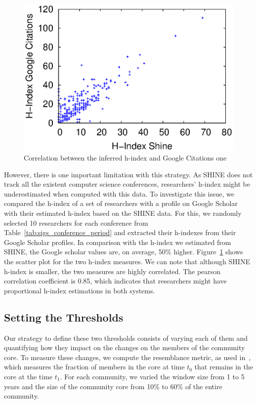 \begin{figure}[!htb]
\centering
\includegraphics[scale=.5]{graficos/hindex/hindex_scatter_plot.eps}
\caption{Correlation between the inferred h-index and Google Citations one}
\label{fig:hindex_scatter_plot}
\end{figure}


However, there is one important limitation with this strategy.  As SHINE does not track all the existent computer science conferences, researchers' h-index might be underestimated when computed
with this data. To investigate this issue, we compared the h-index of a set of researchers with a profile on Google Scholar with their estimated h-index based on the SHINE data. For this, we
randomly selected 10 researchers for each conference from Table~\ref{tab:sigs_conference_period} and extracted their h-indexes from their Google Scholar profiles.  In comparison
with the h-index we estimated from SHINE, the Google scholar values are, on average, 50\% higher. Figure~\ref{fig:hindex_scatter_plot} shows the scatter plot for the two h-index
measures. We can note that although SHINE h-index is smaller, the two measures are highly correlated. The pearson correlation coefficient is 0.85, which indicates that researchers
might have proportional h-index estimations in both systems. 

\subsection{Setting the Thresholds}
\label{sub:thresholds}

Our strategy to define these two thresholds consists of varying each of them and quantifying how they impact on the changes on the members of the community core. To measure these
changes, we compute the resemblance metric, as used in~\cite{Viswanath:2009}, which measures the fraction of members in the core at time $t_0$ that remains in the core at the
time $t_1$. For each community, we varied the window size from 1 to 5 years and the size of the community core from 10\% to 60\% of the entire community.



